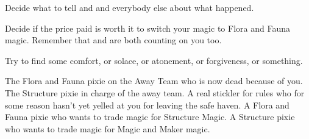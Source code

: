 \documentclass[char]{PP}
\begin{document}
\begin{itemz}
	\item Decide what to tell \cSPM{} and \cELove{} and everybody else about what happened.
	\item Decide if the price paid is worth it to switch your magic to Flora and Fauna magic. Remember that \cFWanabe{} and \cSAdvisor{} are both counting on you too.
	\item Try to find some comfort, or solace, or atonement, or forgiveness, or something.
\end{itemz}

\begin{itemz}[Notes]
	\item 
\end{itemz}

\begin{contacts}
	\contact{\cFLost{}} The Flora and Fauna pixie on the Away Team who is now dead because of you.
	\contact{\cSPM{}} The Structure pixie in charge of the away team. A real stickler for rules who for some reason hasn’t yet yelled at you for leaving the safe haven.
	\contact{\cFWanabe{}} A Flora and Fauna pixie who wants to trade \cFWanabe{\their} magic for Structure Magic.
	\contact{\cSAdvisor{}} A Structure pixie who wants to trade \cSAdvisor{\their} magic for Magic and Maker magic.
\end{contacts}
\end{document}
